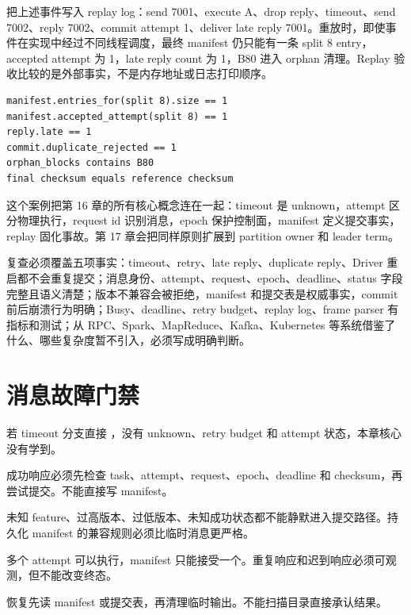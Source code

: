把上述事件写入 replay log：send 7001、execute A、drop reply、timeout、send 7002、reply 7002、commit attempt 1、deliver late reply 7001。重放时，即使事件在实现中经过不同线程调度，最终 manifest 仍只能有一条 split 8 entry，accepted attempt 为 1，late reply count 为 1，B80 进入 orphan 清理。Replay 验收比较的是外部事实，不是内存地址或日志打印顺序。

\begin{lstlisting}[numbers=none,caption={replay 验收断言}]
manifest.entries_for(split 8).size == 1
manifest.accepted_attempt(split 8) == 1
reply.late == 1
commit.duplicate_rejected == 1
orphan_blocks contains B80
final checksum equals reference checksum
\end{lstlisting}

这个案例把第 16 章的所有核心概念连在一起：timeout 是 unknown，attempt 区分物理执行，request id 识别消息，epoch 保护控制面，manifest 定义提交事实，replay 固化事故。第 17 章会把同样原则扩展到 partition owner 和 leader term。

复查必须覆盖五项事实：timeout、retry、late reply、duplicate reply、Driver 重启都不会重复提交；消息身份、attempt、request、epoch、deadline、status 字段完整且语义清楚；版本不兼容会被拒绝，manifest 和提交表是权威事实，commit 前后崩溃行为明确；Busy、deadline、retry budget、replay log、frame parser 有指标和测试；从 RPC、Spark、MapReduce、Kafka、Kubernetes 等系统借鉴了什么、哪些复杂度暂不引入，必须写成明确判断。

\section{消息故障门禁}

若 timeout 分支直接 ，没有 unknown、retry budget 和 attempt 状态，本章核心没有学到。

成功响应必须先检查 task、attempt、request、epoch、deadline 和 checksum，再尝试提交。不能直接写 manifest。

未知 feature、过高版本、过低版本、未知成功状态都不能静默进入提交路径。持久化 manifest 的兼容规则必须比临时消息更严格。

多个 attempt 可以执行，manifest 只能接受一个。重复响应和迟到响应必须可观测，但不能改变终态。

恢复先读 manifest 或提交表，再清理临时输出。不能扫描目录直接承认结果。

